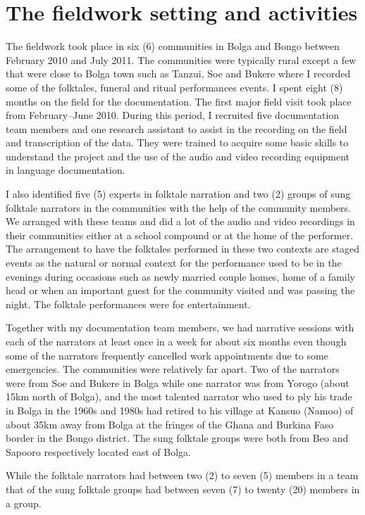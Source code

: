 \documentclass[output=paper,colorlinks,citecolor=brown]{langscibook}
\begin{document}
\section{The fieldwork setting and activities}\label{sec:atintono:4}
The fieldwork took place in six (6) communities in Bolga and Bongo between February 2010 and July 2011. The communities were typically rural except a few that were close to Bolga town such as Tanzui, Soe and Bukere where I recorded some of the folktales, funeral and ritual performances events. I spent eight (8) months on the field for the documentation. The first major field visit took place from February–June 2010. During this period, I recruited five documentation team members and one research assistant to assist in the recording on the field and transcription of the data. They were trained to acquire some basic skills to understand the project and the use of the audio and video recording equipment in language documentation. 

I also identified five (5) experts in folktale narration and two (2) groups of sung folktale narrators in the communities with the help of the community members. We arranged with these teams and did a lot of the audio and video recordings in their communities either at a school compound or at the home of the performer. The arrangement to have the folktales performed in these two contexts are staged events as the natural or normal context for the performance used to be in the evenings during occasions such as newly married couple homes, home of a family head or when an important guest for the community visited and was passing the night. The folktale performances were for entertainment.  

Together with my documentation team members, we had narrative sessions with each of the narrators at least once in a week for about six months even though some of the narrators frequently cancelled work appointments due to some emergencies. The communities were relatively far apart. Two of the narrators were from Soe and Bukere in Bolga while one narrator was from Yorogo (about 15km north of Bolga), and the most talented narrator who used to ply his trade in Bolga in the 1960s and 1980s had retired to his village at Kansuo (Namoo) of about 35km away from Bolga at the fringes of the Ghana and Burkina Faso border in the Bongo district. The sung folktale groups were both from Beo and Sapooro respectively located east of Bolga. 

While the folktale narrators had between two (2) to seven (5) members in a team that of the sung folktale groups had between seven (7) to twenty (20) members in a group.
\end{document}
